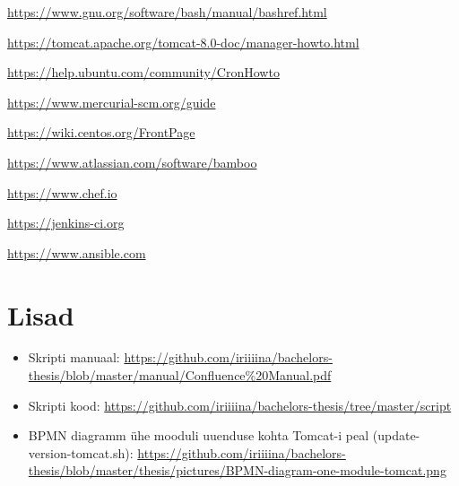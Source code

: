 \documentclass[12pt]{report}
\begin{document}
  \newpage
  
  \begin{thebibliography}{9}
    \label{kasutatud-materjalid}
  
    \url{https://www.gnu.org/software/bash/manual/bashref.html}
    
    \url{https://tomcat.apache.org/tomcat-8.0-doc/manager-howto.html}
  
    \url{https://help.ubuntu.com/community/CronHowto}
  
    \url{https://www.mercurial-scm.org/guide}
  
    \url{https://wiki.centos.org/FrontPage}
  
    \url{https://www.atlassian.com/software/bamboo}
  
    \url{https://www.chef.io}
  
    \url{https://jenkins-ci.org}
  
    \url{https://www.ansible.com}
 
  \end{thebibliography}

  \newpage
  
  \section*{Lisad}
  \label{lisad}
  
  \begin{itemize}
  
    \item Skripti manuaal: \url{https://github.com/iriiiina/bachelors-thesis/blob/master/manual/Confluence%20Manual.pdf}
    
    \item Skripti kood: \url{https://github.com/iriiiina/bachelors-thesis/tree/master/script}
  
    \item BPMN diagramm ühe mooduli uuenduse kohta Tomcat-i peal (update-version-tomcat.sh): \url{https://github.com/iriiiina/bachelors-thesis/blob/master/thesis/pictures/BPMN-diagram-one-module-tomcat.png}
  
  \end{itemize}
\end{document}

